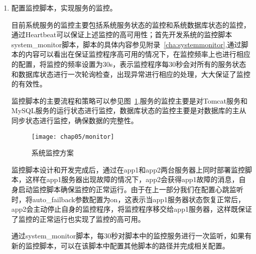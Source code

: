 \begin{enumerate}
authkeys主配置文件配置如下:
\begin{lstlisting}[numbers=none]
auth 2
#1 crc
2 sha1 mimaminishop
#3 md5 somewords
\end{lstlisting}
此文件为不同集群中 heartbeat 节点进行连接的认证文件， 不同集群中该文件采用的算法和密钥必须相同，认证方式有 3 种算法:crc方式、md5加密方式和sha1哈希方式。三种方式中 crc方式只能够校验节点间通信的校验数据包是否损坏，不能进行安全性认证； sha1/md5 两种方式需要进行安全性认证，它们通过一个密钥来进行认证。sha1和md5两种方式相比，sh1方式的资源消耗远小于md5方式，因此在大多数应用中建议使用 sha1 方式\cite{heartbeat配置说明}。

可以看出，示例中使用的是sha1算法，如果要换用其他算法只需要修改auth指令后面的数字，然后取消相应行的注释即可。另外，该文件的属性必须为600，否则heartbeat启动将失败。

haresources主配置文件配置如下:
\begin{lstlisting}[numbers=none]
app1 system_monitor
\end{lstlisting}
这表示Heartbeat启动时会执行资源路径中的system\_monitor脚本，实现服务的监控。

\item 配置监控脚本，实现服务的监控。

目前系统服务的监控主要包括系统服务状态的监控和系统数据库状态的监控，通过Heartbeat可以保证上述监控的高可用性；首先开发系统的监控脚本system\_monitor脚本，脚本的具体内容参见附录~\ref{cha:systemmonitor},通过脚本的内容可以看出在保证监控程序高可用的情况下，在监控频率上也进行相应的配置，将监控的频率设置为30s，表示监控程序每30秒会对所有的服务状态和数据库状态进行一次轮询检查，出现异常进行相应的处理，大大保证了监控的有效性。

监控脚本的主要流程和策略可以参见图~\ref{fig:systemmonitor},服务的监控主要是对Tomcat服务和MySQL服务的运行状态进行监控，数据库状态的监控主要是对数据库的主从同步状态进行监控，确保数据的完整性。
\begin{figure}[H] %
  \centering
  \texttt{[image: chap05/monitor]}
  \caption{系统监控方案}
  \label{fig:systemmonitor}
\end{figure}

监控脚本设计和开发完成后，通过在app1和app2两台服务器上同时部署监控脚本，这样在app1服务器出现故障的情况下，app2会获得app1故障的消息，自身启动监控脚本确保监控的正常运行。由于在上一部分我们在配置心跳监听时，将auto\_failback参数配置为on，这表示当app1服务器状态恢复正常后，app2会主动停止自身的监控程序，将监控程序移交给app1服务器，这样既保证了监控的正常运行也实现了监控的高可用。

通过system\_monitor脚本，每30秒对脚本中的监控服务进行一次监听，如果有新的监控脚本，可以在该脚本中配置其他脚本的路径并完成相关配置。
\end{enumerate}

